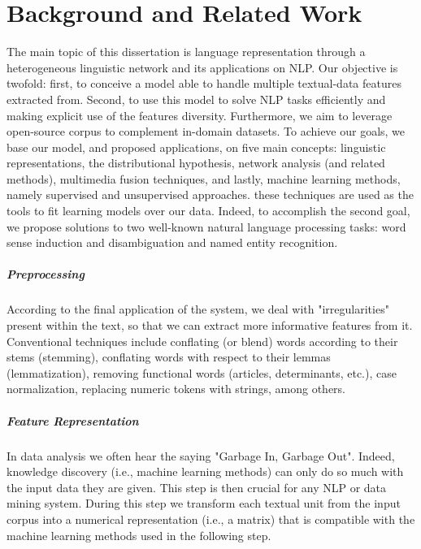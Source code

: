 \chapter{Background and Related Work}
\label{chap:backgnd}
The main topic of this dissertation is language representation through a heterogeneous linguistic network and its applications on NLP. Our objective is twofold: first, to conceive a model able to handle multiple textual-data features extracted from. Second, to use this model to solve NLP tasks efficiently and making explicit use of the features diversity. Furthermore, we aim to leverage open-source corpus to complement in-domain datasets.  To achieve our goals, we base our model, and proposed applications, on five main concepts: linguistic representations, the distributional hypothesis, network analysis (and related methods),  multimedia fusion techniques, and lastly,  machine learning methods, namely supervised and unsupervised approaches. these techniques are used as the tools to fit learning models over our data. Indeed, to accomplish the second goal,  we propose solutions to two well-known natural language processing tasks: word sense induction and disambiguation and named entity recognition. 

\paragraph {Preprocessing}  According to the final application of the system, we deal with "irregularities" present within the text, so that we can extract more informative features from it. Conventional techniques include conflating (or blend) words according to their stems (stemming), conflating words with respect to their lemmas (lemmatization), removing functional words (articles, determinants, etc.), case normalization, replacing numeric tokens with strings, among others.

\paragraph {Feature Representation} In data analysis we often hear the saying "Garbage In, Garbage Out". Indeed, knowledge discovery (i.e., machine learning methods)  can only do so much with the input data they are given.  This step is then crucial for any NLP or data mining system.   During this step we transform each textual unit from the input corpus into a numerical representation (i.e., a matrix) that is compatible with the machine learning methods used in the following step.

